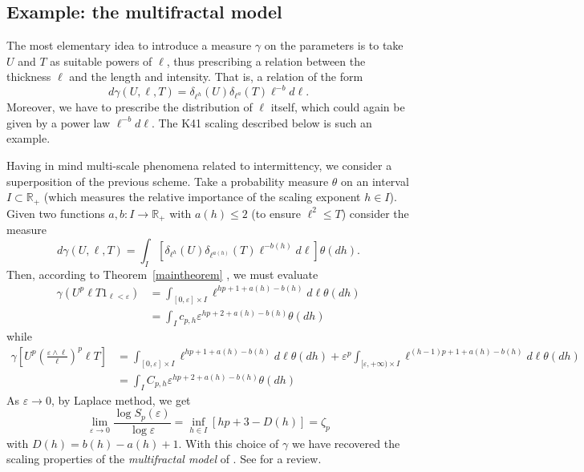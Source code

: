 \documentclass[a4paper,12pt]{article}
\begin{document}
\subsection{Example: the multifractal model\label{multifrexample}}

The most elementary idea to introduce a measure $\gamma$ on the parameters is
to take $U$ and $T$ as suitable powers of $\ell$, thus prescribing a relation
between the thickness $\ell$ and the length and intensity. That is, a relation
of the form
\[
d\gamma(U,\ell,T)=\delta_{\ell^{h}}(U)\delta_{\ell^{a}}(T)\ell^{-b}d\ell.
\]
Moreover, we have to prescribe the distribution of $\ell$ itself, which could
again be given by a power law $\ell^{-b}d\ell$. The K41 scaling described
below is such an example.

Having in mind multi-scale phenomena related to intermittency, we consider a
superposition of the previous scheme. Take a probability measure $\theta$ on
an interval $I\subset\mathbb{R}_{+}$ (which measures the relative importance
of the scaling exponent $h\in I$). Given two functions $a,b:I\rightarrow
\mathbb{R}_{+}$ with $a(h)\leq2$ (to ensure $\ell^{2}\leq T$) consider the
measure
\begin{equation}
d\gamma(U,\ell,T)=\int_{I}\left[  \delta_{\ell^{h}}(U)\delta_{\ell^{a(h)}%
}(T)\ell^{-b(h)}d\ell\right]  \theta(dh).
\end{equation}
Then, according to Theorem~\ref{maintheorem}
%
%
%
, we must evaluate
\begin{equation}%
\begin{split}
\gamma(U^{p}\ell T1_{\ell<\varepsilon})  &  =\int_{[0,\varepsilon]\times
I}\ell^{hp+1+a(h)-b(h)}d\ell\theta(dh)\\
&  =\int_{I}c_{p,h}\varepsilon^{hp+2+a(h)-b(h)}\theta(dh)
\end{split}
\label{estmultifr}%
\end{equation}
while
\[%
\begin{split}
\gamma\left[  U^{p}\left(  \frac{\varepsilon\wedge\ell}{\ell}\right)  ^{p}\ell
T\right]   &  =\int_{[0,\varepsilon]\times I}\ell^{hp+1+a(h)-b(h)}d\ell
\theta(dh)+\varepsilon^{p}\int_{[\varepsilon,+\infty)\times I}\ell
^{(h-1)p+1+a(h)-b(h)}d\ell\theta(dh)\\
&  =\int_{I}C_{p,h}\varepsilon^{hp+2+a(h)-b(h)}\theta(dh)
\end{split}
\]
As $\varepsilon\rightarrow0$, by Laplace method, we get
\[
\lim_{\varepsilon\rightarrow0}\frac{\log S_{p}(\varepsilon)}{\log\varepsilon
}=\inf_{h\in I}[hp+3-D(h)]=\zeta_{p}%
\]
with $D(h)=b(h)-a(h)+1$. With this choice of $\gamma$ we have recovered the
scaling properties of the \textit{multifractal model} of \cite{Parisi-Frisch}.
See \cite{frisch} for a review.
\end{document}
